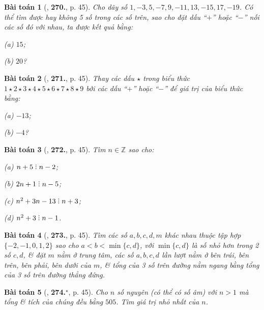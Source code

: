 \documentclass{article}
\numberwithin{equation}{section}
\newtheorem{baitoan}{Bài toán}
\DeclareRobustCommand{\divby}{%
	\mathrel{\vbox{\baselineskip.65ex\lineskiplimit0pt\hbox{.}\hbox{.}\hbox{.}}}%
}
\begin{document}
\begin{baitoan}[\cite{Binh_Toan_6_tap_1}, \textbf{270.}, p. 45]
	Cho dãy số $1,-3,5,-7,9,-11,13,-15,17,-19$. Có thể tìm được hay không 5 số trong các số trên, sao cho đặt dấu ``$+$'' hoặc ``$-$'' nối các số đó với nhau, ta được kết quả bằng:
	\begin{enumerate*}
		\item[(a)] $15$;
		\item[(b)] $20$?
	\end{enumerate*}
\end{baitoan}

\begin{baitoan}[\cite{Binh_Toan_6_tap_1}, \textbf{271.}, p. 45]
	Thay các dấu  $\star$ trong biểu thức $1\star2\star3\star4\star5\star6\star7\star8\star9$ bởi các dấu ``$+$'' hoặc ``$-$'' để giá trị của biểu thức bằng:
	\begin{enumerate*}
		\item[(a)] $-13$;
		\item[(b)] $-4$?
	\end{enumerate*}
\end{baitoan}

\begin{baitoan}[\cite{Binh_Toan_6_tap_1}, \textbf{272.}, p. 45]
	Tìm $n\in\mathbb{Z}$ sao cho:
	\begin{enumerate*}
		\item[(a)] $n + 5\divby n - 2$;
		\item[(b)] $2n + 1\divby n - 5$;
		\item[(c)] $n^2 + 3n - 13\divby n + 3$;
		\item[(d)] $n^2 + 3\divby n - 1$.
	\end{enumerate*}
\end{baitoan}

\begin{baitoan}[\cite{Binh_Toan_6_tap_1}, \textbf{273.}, p. 45]
	Tìm các số $a,b,c,d,m$ khác nhau thuộc tập hợp $\{-2,-1,0,1,2\}$ sao cho $a < b < \min\{c,d\}$, với $\min\{c,d\}$ là số nhỏ hơn trong 2 số $c,d$, \& đặt $m$ nằm ở trung tâm, các số $a,b,c,d$ lần lượt nằm ở bên trái, bên trên, bên phải, bên dưới của $m$, \& tổng của 3 số trên đường nằm ngang bằng tổng của 3 số trên đường thẳng đứng.
\end{baitoan}

\begin{baitoan}[\cite{Binh_Toan_6_tap_1}, \textbf{274.}${}^\star$, p. 45]
	Cho $n$ số nguyên (có thể có số âm) với $n > 1$ mà tổng \& tích của chúng đều bằng $505$. Tìm giá trị nhỏ nhất của $n$.
\end{baitoan}


\printbibliography[heading=bibintoc]
	
\end{document}
